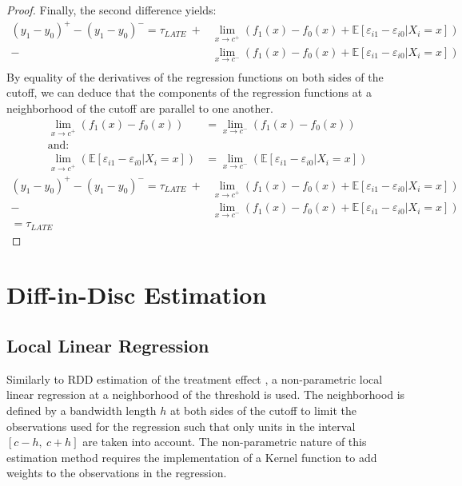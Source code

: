 \documentclass[12pt]{article}
\theoremstyle{plain}
\theoremstyle{remark}
\begin{document}
\begin{proof}
Finally, the second difference yields:
    \begin{align*}
        (y_1 - y_0)^+ - (y_1 - y_0)^- = \tau_{LATE}\ + &\lim_{x\rightarrow c^+} \left(f_1(x)-f_0(x) +  \mathbb{E}\left[\varepsilon_{i1}-\varepsilon_{i0} |X_i=x\right]\right)\\
        - &\lim_{x\rightarrow c^-} \left(f_1(x)- f_0(x) + \mathbb{E}\left[\varepsilon_{i1}-\varepsilon_{i0} |X_i=x\right]\right)\\
    \end{align*}
By equality of the derivatives of the regression functions on both sides of the cutoff, we can deduce that the components of the regression functions at a neighborhood of the cutoff are parallel to one another.\\
    \begin{align*}
        \lim_{x\rightarrow c^+} \left(f_1(x)-f_0(x)\right) &= \lim_{x\rightarrow c^-} \left(f_1(x)- f_0(x)\right)\\
        \text{and:} \\
        \lim_{x\rightarrow c^+} \left(
        \mathbb{E}\left[\varepsilon_{i1}-\varepsilon_{i0} |X_i=x\right]\right) &= \lim_{x\rightarrow c^-} \left(\mathbb{E}\left[\varepsilon_{i1}-\varepsilon_{i0} |X_i=x\right]\right)
    \end{align*}
\begin{align*}
        (y_1 - y_0)^+ - (y_1 - y_0)^- = \tau_{LATE}\ + &\lim_{x\rightarrow c^+} \left(f_1(x)-f_0(x) +  \mathbb{E}\left[\varepsilon_{i1}-\varepsilon_{i0} |X_i=x\right]\right)\\
        - &\lim_{x\rightarrow c^-} \left(f_1(x)- f_0(x) + \mathbb{E}\left[\varepsilon_{i1}-\varepsilon_{i0} |X_i=x\right]\right)\\
        =\tau_{LATE}\ \ \ &
    \end{align*}
\end{proof}

\newpage 
\section{Diff-in-Disc Estimation}

\subsection{Local Linear Regression}

Similarly to RDD estimation of the treatment effect \parencite{Cattaneo2020}, a non-parametric local linear regression at a neighborhood of the threshold is used. The neighborhood is defined by a bandwidth length $h$ at both sides of the cutoff to limit the observations used for the regression such that only units in the interval $ \left[c-h,\ c+h\right]$ are taken into account. The non-parametric nature of this estimation method requires the implementation of a Kernel function to add weights to the observations in the regression. 
\end{document}

